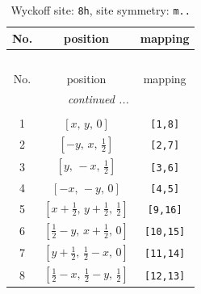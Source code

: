 \documentclass[fleqn,8pt]{jsarticle}
\begin{document}
\begin{longtable}{ccc}
\caption{Wyckoff site: {\tt 8h}, site symmetry: {\tt m..}}
 \\
 \hline \hline
No. & position & mapping \\ \hline \endfirsthead

\multicolumn{2}{l}{\tablename\ \thetable{}} \\
 \hline \hline
No. & position & mapping \\ \hline \endhead

 \hline \hline
\multicolumn{2}{r}{\footnotesize\it continued ...} \\ \endfoot

 \hline \hline
\multicolumn{2}{r}{} \\ \endlastfoot

1 & $\left[ x,\, y,\, 0 \right]$ & {\tt [1,8]} \\ \hline
2 & $\left[ - y,\, x,\, \frac{1}{2} \right]$ & {\tt [2,7]} \\ \hline
3 & $\left[ y,\, - x,\, \frac{1}{2} \right]$ & {\tt [3,6]} \\ \hline
4 & $\left[ - x,\, - y,\, 0 \right]$ & {\tt [4,5]} \\ \hline
5 & $\left[ x + \frac{1}{2},\, y + \frac{1}{2},\, \frac{1}{2} \right]$ & {\tt [9,16]} \\ \hline
6 & $\left[ \frac{1}{2} - y,\, x + \frac{1}{2},\, 0 \right]$ & {\tt [10,15]} \\ \hline
7 & $\left[ y + \frac{1}{2},\, \frac{1}{2} - x,\, 0 \right]$ & {\tt [11,14]} \\ \hline
8 & $\left[ \frac{1}{2} - x,\, \frac{1}{2} - y,\, \frac{1}{2} \right]$ & {\tt [12,13]} \\
\end{longtable}
\renewcommand{\arraystretch}{1.2}
\end{document}

